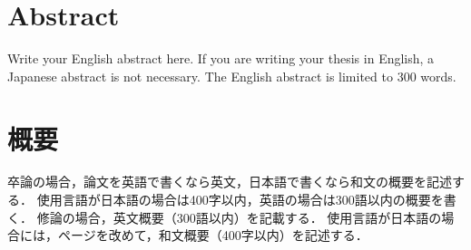 
\section*{Abstract}

Write your English abstract here. 
If you are writing your thesis in English, a Japanese abstract is not necessary. 
The English abstract is limited to 300 words.

\clearpage


\section*{概要}

卒論の場合，論文を英語で書くなら英文，日本語で書くなら和文の概要を記述する．
使用言語が日本語の場合は400字以内，英語の場合は300語以内の概要を書く．
修論の場合，英文概要（300語以内）を記載する．
使用言語が日本語の場合には，ページを改めて，和文概要（400字以内）を記述する．

\clearpage